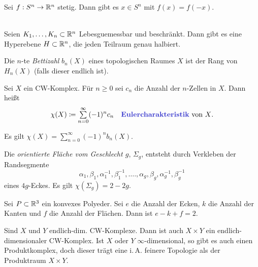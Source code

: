 \documentclass{cheat-sheet}
\begin{document}
\begin{satz}
  Sei $f : S^n \to \mathbb{R}^n$ stetig. Dann gibt es $x \in S^n$ mit $f(x) = f(-x)$.
\end{satz}

\begin{satz}\mbox{}\\
  Seien $K_1, \ldots, K_n \subset \mathbb{R}^n$ Lebesguemessbar und beschränkt. Dann gibt es eine Hyperebene $H \subset \mathbb{R}^n$, die jeden Teilraum genau halbiert.
\end{satz}


\begin{defn}
  Die $n$-te \emph{Bettizahl} $b_n(X)$ eines topologischen Raumes $X$ ist der Rang von $H_n(X)$ (falls dieser endlich ist).
\end{defn}

\begin{defn}
  Sei $X$ ein CW-Komplex. Für $n \geq 0$ sei $c_n$ die Anzahl der $n$-Zellen in $X$. Dann heißt
  \[
    \chi(X) \coloneqq \sum_{n=0}^\infty (-1)^n c_n
    \quad \text{\emph{Eulercharakteristik} von $X$.}
  \]
\end{defn}

\begin{satz}
  Es gilt $\chi(X) = \sum_{n=0}^\infty (-1)^n b_n(X)$.
\end{satz}

\begin{bsp}
  Die \emph{orientierte Fläche vom Geschlecht $g$}, $\Sigma_g$, entsteht durch Verkleben der Randsegmente
  \[ \alpha_1, \beta_1, \alpha_1^{-1}, \beta_1^{-1}, \ldots., \alpha_g, \beta_g, \alpha_g^{-1}, \beta_g^{-1} \]
  eines $4g$-Eckes. Es gilt $\chi(\Sigma_g) = 2 - 2g$.
\end{bsp}

\begin{kor}
  Sei $P \subset \mathbb{R}^3$ ein konvexes Polyeder. Sei $e$ die Anzahl der Ecken, $k$ die Anzahl der Kanten und $f$ die Anzahl der Flächen. Dann ist $e - k + f = 2$.
\end{kor}


\begin{bem}
  Sind $X$ und $Y$ endlich-dim. CW-Komplexe. Dann ist auch $X \times Y$ ein endlich-dimensionaler CW-Komplex. Ist $X$ oder $Y$ $\infty$-dimensional, so gibt es auch einen Produktkomplex, doch dieser trägt eine i.\,A. feinere Topologie als der Produktraum $X \times Y$.
\end{bem}
\end{document}
